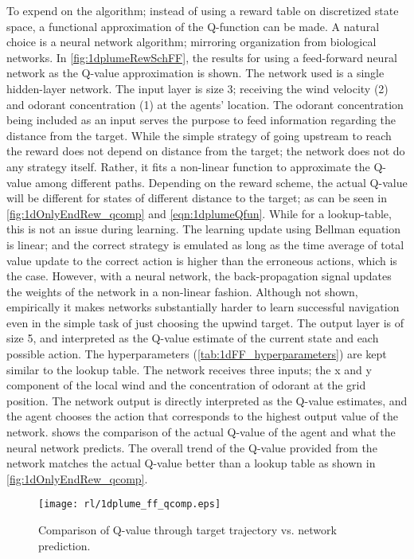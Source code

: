 \documentclass[../dissertation.tex]{subfiles}
\begin{document}
To expend on the algorithm; instead of using a reward table on discretized state space, a functional approximation of the Q-function can be made.
A natural choice is a neural network algorithm; mirroring organization from biological networks.
In \cref{fig:1dplumeRewSchFF}, the results for using a feed-forward neural network as the Q-value approximation is shown.
The network used is a single hidden-layer network.
The input layer is size 3; receiving the wind velocity (2) and odorant concentration (1) at the agents' location.
The odorant concentration being included as an input serves the purpose to feed information regarding the distance from the target.
While the simple strategy of going upstream to reach the reward does not depend on distance from the target; the network does not do any strategy itself.
Rather, it fits a non-linear function to approximate the Q-value among different paths.
Depending on the reward scheme, the actual Q-value will be different for states of different distance to the target; as can be seen in  \cref{fig:1dOnlyEndRew_qcomp} and \cref{eqn:1dplumeQfun}.
While for a lookup-table, this is not an issue during learning.
The learning update using Bellman equation is linear; and the correct strategy is emulated as long as the time average of total value update to the correct action is higher than the erroneous actions, which is the case.
However, with a neural network, the back-propagation signal updates the weights of the network in a non-linear fashion.
Although not shown, empirically it makes networks substantially harder to learn successful navigation even in the simple task of just choosing the upwind target.
The output layer is of size 5, and interpreted as the Q-value estimate of the current state and each possible action.
The hyperparameters (\cref{tab:1dFF_hyperparameters}) are kept similar to the lookup table.
The network receives three inputs; the x and y component of the local wind and the concentration of odorant at the grid position.
The network output is directly interpreted as the Q-value estimates, and the agent chooses the action that corresponds to the highest output value of the network.
 shows the comparison of the actual Q-value of the agent and what the neural network predicts.
The overall trend of the Q-value provided from the network matches the actual Q-value better than a lookup table as shown in \cref{fig:1dOnlyEndRew_qcomp}.

\begin{figure}[ht]
    \centering
    \texttt{[image: rl/1dplume\_ff\_qcomp.eps]}
    \caption{Comparison of Q-value through target trajectory vs. network prediction.}
    \label{fig:1dplumeQcompFF}
\end{figure}
\end{document}
